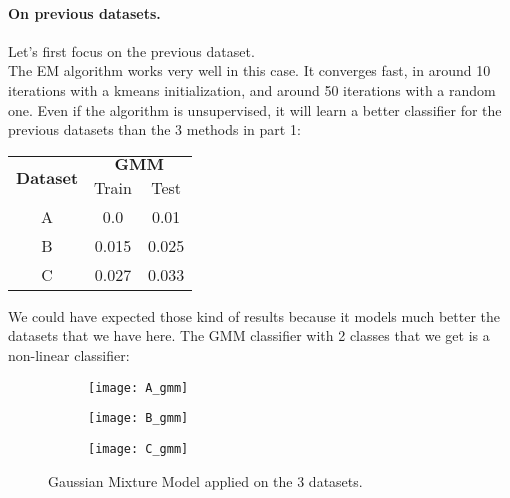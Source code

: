 \documentclass{article}
\begin{document}
\paragraph{On previous datasets.} Let's first focus on the previous dataset.\vspace*{10px}\\
The EM algorithm works very well in this case. It converges fast, in around 10 iterations with a kmeans initialization, and around 50 iterations
with a random one. Even if the algorithm is unsupervised, it will learn a better classifier for the previous datasets than the 3 methods in part 1:

\begin{center}
    \begin{tabular}{| c || c | c |}
        \hline
        \multirow{2}{*}{$\mathbf{Dataset}$} & \multicolumn{2}{|c|}{$\mathbf{GMM}$}         \\
                                            & Train                                & Test  \\
        \hline
        A                                   & 0.0                                  & 0.01  \\
        \hline
        B                                   & 0.015                                & 0.025 \\
        \hline
        C                                   & 0.027                                & 0.033 \\
        \hline
    \end{tabular}
\end{center}
We could have expected those kind of results because it models much better the datasets that we have here. The GMM classifier with 2 classes that we get is
a non-linear classifier:
\begin{figure}[h!]
    \centering
    \begin{subfigure}[b]{0.3\linewidth}
        \texttt{[image: A\_gmm]}
    \end{subfigure}
    \begin{subfigure}[b]{0.3\linewidth}
        \texttt{[image: B\_gmm]}
    \end{subfigure}
    \begin{subfigure}[b]{0.3\linewidth}
        \texttt{[image: C\_gmm]}
    \end{subfigure}
    \caption{Gaussian Mixture Model applied on the 3 datasets.}
    \label{fig:gmm}
\end{figure}
\end{document}
